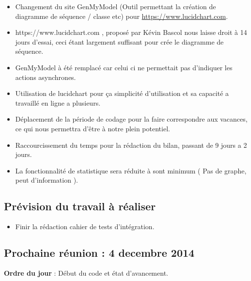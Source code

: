 \documentclass[12pt,a4paper]{article}
\begin{document}
\begin{itemize}[label = $\ast$]
	\item Changement du site GenMyModel (Outil permettant la création de diagramme de séquence / classe etc)  pour \url{https://www.lucidchart.com}.
	\item https://www.lucidchart.com , proposé par Kévin Bascol nous laisse droit à 14 jours d'essai, ceci 	étant largement suffisant pour crée le diagramme de séquence.
	\item GenMyModel à été remplacé car celui ci ne permettait pas d'indiquer les actions asynchrones.
	\item Utilisation de lucidchart pour ça simplicité d'utilisation et sa capacité a travaillé en ligne a plusieurs.
	\item Déplacement de la période de codage pour la faire correspondre aux vacances, ce qui nous permettra d'être à notre plein potentiel.
	\item Raccourcissement du temps pour la rédaction du bilan, passant de 9 jours a 2 jours.
	\item La fonctionnalité de statistique sera réduite à sont minimum ( Pas de graphe, peut d'information ).
\end{itemize}

\subsection*{Prévision du travail à réaliser}

\begin{itemize}[label = $\ast$]
	\item Finir la rédaction cahier de tests d'intégration.
\end{itemize}

\subsection*{Prochaine réunion : 4 decembre 2014}

\textbf{Ordre du jour} : Début du code et état d'avancement.\\
\end{document}
